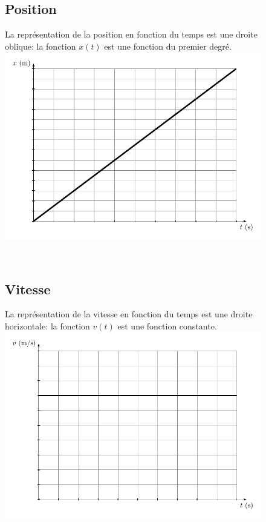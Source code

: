 \documentclass[
  letterpaper,
  DIV=11,
  numbers=noendperiod]{scrartcl}
\theoremstyle{definition}
\theoremstyle{definition}
\theoremstyle{remark}
\begin{document}
\begin{figure}

\begin{minipage}{0.47\linewidth}

\subsection{Position}\label{position}

La représentation de la position en fonction du temps est une droite
oblique: la fonction \(x(t)\) est une fonction du premier degré.
\includegraphics[width=1\textwidth,height=\textheight]{figures/mru/fig4.pdf}\end{minipage}%
%
\begin{minipage}{0.05\linewidth}
~\end{minipage}%
%
\begin{minipage}{0.47\linewidth}

\subsection{Vitesse}\label{vitesse}

La représentation de la vitesse en fonction du temps est une droite
horizontale: la fonction \(v(t)\) est une fonction constante.
\includegraphics[width=1\textwidth,height=\textheight]{figures/mru/fig5.pdf}\end{minipage}%


\end{figure}
\end{document}

